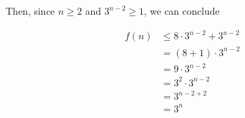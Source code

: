 \documentclass[12pt]{article}
\begin{document}
\begin{itemize}
\begin{mdframed}
\begin{itemize}
\begin{mdframed}
            \bigskip

            Then, since $n \geq 2$ and $3^{n-2} \geq 1$, we can conclude

            \begin{align}
                f(n) &\leq 8 \cdot 3^{n-2} + 3^{n-2}\\
                &= (8+1) \cdot 3^{n-2}\\
                &= 9 \cdot 3^{n-2}\\
                &= 3^2 \cdot 3^{n-2}\\
                &= 3^{n-2+2}\\
                &= 3^n
            \end{align}
            \end{mdframed}
        \end{itemize}
    \end{mdframed}
\end{itemize}
\end{document}

